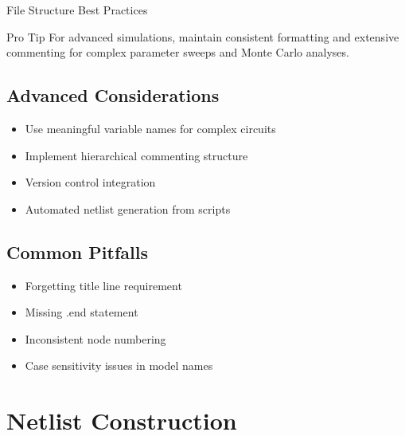 \documentclass{beamer}
\begin{document}
\begin{frame}{File Structure Best Practices}
    \begin{alertblock}{Pro Tip}
        For advanced simulations, maintain consistent formatting and extensive commenting for complex parameter sweeps and Monte Carlo analyses.
    \end{alertblock}
    
    \subsection{Advanced Considerations}
    \begin{itemize}
        \item Use meaningful variable names for complex circuits
        \item Implement hierarchical commenting structure
        \item Version control integration
        \item Automated netlist generation from scripts
    \end{itemize}
    
    \subsection{Common Pitfalls}
    \begin{itemize}
        \item Forgetting title line requirement
        \item Missing .end statement
        \item Inconsistent node numbering
        \item Case sensitivity issues in model names
    \end{itemize}
\end{frame}

\section{Netlist Construction}
\end{document}
